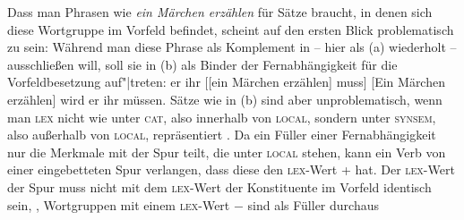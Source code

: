 Dass man Phrasen wie \emph{ein Märchen erzählen} für Sätze braucht, in denen sich diese Wortgruppe im Vorfeld
befindet, scheint auf den ersten Blick problematisch zu sein: Während man diese Phrase als Komplement
in  -- hier als (a) wiederholt -- ausschließen will,
soll sie in (b) als Binder der Fernabhängigkeit
für die Vorfeldbesetzung auf"|treten:
\eal
\ex er ihr [[ein Märchen erzählen] muss]
\ex {}[Ein Märchen erzählen] wird er ihr müssen.
\zl
Sätze wie in (b) sind aber unproblematisch, wenn man \textsc{lex} nicht wie \citet[]{ps2}
unter \textsc{cat}, also innerhalb von \textsc{local}, sondern unter \textsc{synsem}, also außerhalb von
\textsc{local}, repräsentiert \citep{Mueller96a,Mueller99a,Mueller2002b,Meurers99a}.
Da ein Füller einer Fernabhängigkeit nur die Merkmale mit der Spur teilt, die unter \textsc{local} stehen,
kann ein Verb von einer eingebetteten Spur verlangen, dass diese den \textsc{lex}-Wert + hat. Der \textsc{lex}-Wert
der Spur muss nicht mit dem \textsc{lex}-Wert der Konstituente im Vorfeld identisch sein,
\dash, Wortgruppen mit einem \textsc{lex}-Wert $-$ sind als Füller durchaus
